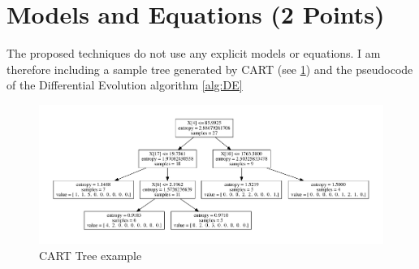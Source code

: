 \documentclass[12pt, journal, onecolumn]{IEEEtran}
\begin{document}
\section{Models and Equations (2 Points)}
The proposed techniques do not use any explicit models or equations. I am therefore including a sample tree generated by CART (see \ref{fig:CARTtree}) and the pseudocode of the Differential Evolution algorithm \ref{alg:DE}
\begin{figure}[h!]
  \centering
  \includegraphics[width=0.9\linewidth]{tree2.pdf}
  \caption{CART Tree example} \label{fig:CARTtree}
\end{figure}
\end{document}
